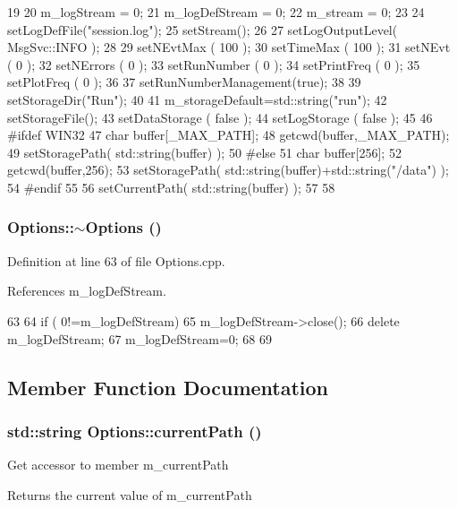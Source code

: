 \begin{DoxyCode}
19                    {
20   m_logStream    = 0;
21   m_logDefStream = 0;
22   m_stream       = 0;
23 
24   setLogDefFile("session.log");
25   setStream();
26 
27   setLogOutputLevel( MsgSvc::INFO );
28 
29   setNEvtMax   ( 100  );
30   setTimeMax   ( 100  );
31   setNEvt      ( 0    );
32   setNErrors   ( 0    );
33   setRunNumber ( 0    );
34   setPrintFreq ( 0    );
35   setPlotFreq ( 0    );
36 
37   setRunNumberManagement(true);
38 
39   setStorageDir("Run");
40 
41   m_storageDefault=std::string("run");
42   setStorageFile();
43   setDataStorage ( false );
44   setLogStorage  ( false );
45 
46 #ifdef WIN32
47   char buffer[_MAX_PATH];
48   getcwd(buffer,_MAX_PATH);
49   setStoragePath( std::string(buffer) );
50 #else
51   char buffer[256];
52   getcwd(buffer,256);
53   setStoragePath( std::string(buffer)+std::string("/data") );
54 #endif
55 
56   setCurrentPath( std::string(buffer) );
57 
58 }
\end{DoxyCode}
\hypertarget{classOptions_a86ddb85b183f8b58af5481f30a42fa92}{
\subsubsection[{$\sim$Options}]{\setlength{\rightskip}{0pt plus 5cm}Options::$\sim$Options ()}}
\label{classOptions_a86ddb85b183f8b58af5481f30a42fa92}


Definition at line 63 of file Options.cpp.

References m\_\-logDefStream.


\begin{DoxyCode}
63                   {
64   if ( 0!=m_logDefStream){
65     m_logDefStream->close();
66     delete m_logDefStream;
67     m_logDefStream=0;
68   }
69 }
\end{DoxyCode}


\subsection{Member Function Documentation}
\hypertarget{classOptions_ab9cf7442a712fe8593f6cf5cfff36a5d}{
\subsubsection[{currentPath}]{\setlength{\rightskip}{0pt plus 5cm}std::string Options::currentPath ()}}
\label{classOptions_ab9cf7442a712fe8593f6cf5cfff36a5d}
Get accessor to member m\_\-currentPath \begin{DoxyReturn}{Returns}
the current value of m\_\-currentPath 
\end{DoxyReturn}


